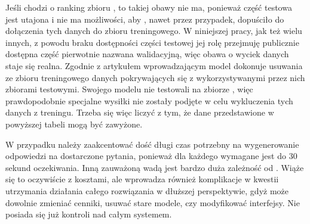 Jeśli chodzi o ranking zbioru , to takiej obawy nie ma, ponieważ część testowa jest utajona i nie ma możliwości, aby , nawet przez przypadek, dopuściło do dołączenia tych danych do zbioru treningowego. W niniejszej pracy, jak też wielu innych, z powodu braku dostępności części testowej jej rolę przejmuję publicznie dostępna część pierwotnie nazwana walidacyjną, więc obawa o wyciek danych staje się realna. Zgodnie z artykułem wprowadzającym model \mbox{}   dokonuje usuwania ze zbioru treningowego danych pokrywających się z wykorzystywanymi przez nich zbiorami testowymi. Swojego modelu nie testowali na zbiorze , więc prawdopodobnie specjalne wysiłki nie zostały podjęte w celu wykluczenia tych danych z treningu. Trzeba się więc liczyć z tym, że dane przedstawione w powyższej tabeli mogą być zawyżone.

W przypadku  należy zaakcentować dość długi czas potrzebny na wygenerowanie odpowiedzi na dostarczone pytania, ponieważ dla każdego wymagane jest do 30 sekund oczekiwania. Inną zauważoną wadą jest bardzo duża zależność od . Wiąże się to oczywiście z kosztami, ale wprowadza również komplikacje w kwestii utrzymania działania całego rozwiązania w dłuższej perspektywie, gdyż  może dowolnie zmieniać cenniki, usuwać stare modele, czy modyfikować interfejsy. Nie posiada się już kontroli nad całym systemem.